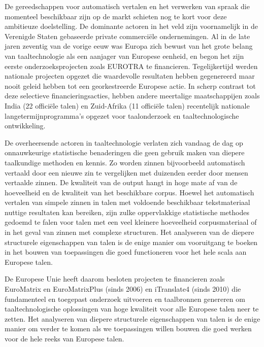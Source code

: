 \documentclass[]{../../metanetpaper}
\begin{document}
\begin{multicols}{2}
    De gereedschappen voor automatisch vertalen en het verwerken van spraak die momenteel beschikbaar zijn op de markt schieten nog te kort voor deze ambitieuze doelstelling. De dominante actoren in het veld zijn voornamelijk in de Verenigde Staten gebaseerde private commerci{\"e}le ondernemingen. Al in de late jaren zeventig van de vorige eeuw was Europa zich bewust van het grote belang van taaltechnologie als een aanjager van Europese eenheid, en begon het zijn eerste onderzoeksprojecten zoals EUROTRA te financieren. Tegelijkertijd werden nationale projecten opgezet die waardevolle resultaten hebben gegenereerd maar nooit geleid hebben tot een georkestreerde Europese actie. In scherp contrast tot deze selectieve financieringsacties, hebben andere meertalige maatschappijen zoals India (22 offici{\"e}le talen) en Zuid-Afrika (11 offici{\"e}le talen) recentelijk nationale langetermijnprogramma's opgezet voor taalonderzoek en taaltechnologische ontwikkeling.

    De overheersende actoren in taaltechnologie verlaten zich vandaag de dag op onnauwkeurige statistische benaderingen die geen gebruik maken van diepere taalkundige methoden en kennis. Zo worden zinnen bijvoorbeeld automatisch vertaald door een nieuwe zin te vergelijken met duizenden eerder door mensen vertaalde zinnen. De kwaliteit van de output hangt in hoge mate af van de hoeveelheid en de kwaliteit van het beschikbare corpus. Hoewel het automatisch vertalen van simpele zinnen in talen met voldoende beschikbaar tekstmateriaal nuttige resultaten kan bereiken, zijn zulke oppervlakkige statistische methodes gedoemd te falen voor talen met een veel kleinere hoeveelheid corpusmateriaal of in het geval van zinnen met complexe structuren. Het analyseren van de diepere structurele eigenschappen van talen is de enige manier om vooruitgang te boeken in het bouwen van toepassingen die goed functioneren voor het hele scala aan Europese talen.
    

    De Europese Unie heeft daarom besloten projecten te financieren zoals EuroMatrix en EuroMatrixPlus (sinds 2006) en iTranslate4 (sinds 2010) die fundamenteel en toegepast onderzoek uitvoeren en taalbronnen genereren om taaltechnologische oplossingen van hoge kwaliteit voor alle Europese talen neer te zetten. Het analyseren van diepere structurele eigenschappen van talen is de enige manier om verder te komen als we toepassingen willen bouwen die goed werken voor de hele reeks van Europese talen.


\end{multicols}
\end{document}
